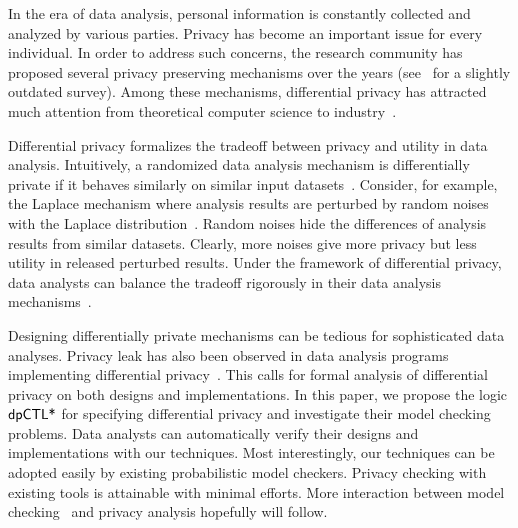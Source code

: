 

In the era of data analysis, personal information is constantly
collected and analyzed by various parties. Privacy has become an
important issue for every individual. In order to address such
concerns, the research community has proposed several privacy
preserving mechanisms over the years (see~\cite{FWC:10:PPDP} for a
slightly outdated survey). Among these mechanisms, differential
privacy has attracted much attention from theoretical computer science
to industry~\cite{DR:14:AFDP,JLE:14:DPML,A:16:EPYU}.

Differential privacy formalizes the tradeoff between privacy and
utility in data analysis. Intuitively, a randomized data analysis
mechanism is differentially private if it behaves similarly on similar
input datasets~\cite{DMNS:06:CNSPD,D:06:DP}. Consider, for example,
the Laplace mechanism where analysis results are perturbed by random
noises with the Laplace distribution~\cite{DR:14:AFDP}. Random noises
hide the differences of analysis results from similar datasets.
Clearly, more noises
give more privacy but less utility in released perturbed
results. Under the framework of differential privacy, data analysts
can balance the tradeoff rigorously in their data analysis
mechanisms~\cite{DR:14:AFDP,JLE:14:DPML}.


Designing differentially private mechanisms can be tedious for
sophisticated data analyses. Privacy leak has also been observed in
data analysis programs implementing differential
privacy~\cite{M:12:SLSBDP,TKBW:17:PLAI}. This calls for formal 
analysis of differential privacy on both designs and implementations.
In this paper, we propose the logic $\textsf{dpCTL*}$ for specifying
differential privacy and investigate their model checking
problems. Data analysts can automatically verify their designs and
implementations with our techniques. Most interestingly, our
techniques can be adopted easily by existing probabilistic
model checkers. Privacy checking with existing tools is attainable
with minimal efforts. More interaction
between model checking~\cite{CGPMC,BK:08:PMC} and privacy analysis hopefully will follow.


